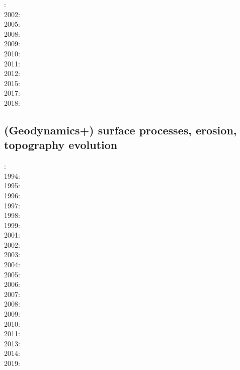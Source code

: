 : \cite{coks00}\\
2002: \cite{cacp02}\cite{coks02}\\
2005: \cite{cacs05}\cite{coks05}\\
2008: \cite{kans08}\cite{mofh08}\\
2009: \cite{coks09}\cite{cogo09}\\
2010: \cite{ngpc10}\cite{conp10}\cite{mofp10}\\
2011: \cite{geor11}\cite{ngpc11}\\
2012: \cite{kauf12}\cite{ngpe12}\\
2015: \cite{lelk15} \\
2017: \cite{fewk17}\cite{iglo17}\cite{hepb17}\\
2018: \cite{puth18}

\subsection*{(Geodynamics+) surface processes, erosion, topography evolution}

: \cite{befh92}\\
1994: \cite{howa94}\cite{koon94}\cite{kobe94}\\
1995: \cite{chmm95}\cite{koon95}\\
1996: \cite{avbu96}\\
1997: \cite{brsa97}\\
1998: \cite{deea98}\\
1999: \cite{will99a}\cite{bupi99}\cite{babr99}\\
2001: \cite{zemk01}\cite{tulg01}\cite{brsh01}\cite{bupo01}\cite{coul01}\cite{crda01}\\
2002: \cite{wibr02}\\
2003: \cite{brau03}\\
2004: \cite{fijj04}\\
2005: \cite{lave05}\cite{will05}\\
2006: \cite{rosw06}\cite{brau06gsl}\\
2007: \cite{buto07}\\
2008: \cite{alle08}\cite{rowf08}\\
2009: \cite{whip09}\cite{kuhe09}\\
2010: \cite{will10}\cite{tuha10}\cite{brau10b}\cite{brau10}\cite{brya10}\cite{cmwt10}\\
2011: \cite{robr11}\\
2013: \cite{vehc13}\cite{brwi13}\cite{fihv13a}\cite{fihv13b} \\
2014: \cite{crbr14}\cite{cokm14}\cite{erhv14}\cite{erhv15} \\
2019: \cite{anpa19}

